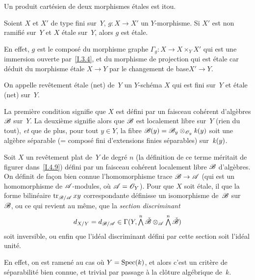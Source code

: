 \begin{corollaire}
\label{I.4.7}
Un produit cart\'esien de deux morphismes \'etales est itou.
\end{corollaire}

\begin{corollaire}
\label{I.4.8}
Soient $X$ et $X'$ de type fini sur~$Y$, $g\colon X\to X'$ un
$Y$-morphisme. Si $X'$ est non ramifi\'e sur~$Y$ et $X$ \'etale
sur~$Y$, alors $g$ est \'etale.
\end{corollaire}

En effet, $g$ est le compos\'e du morphisme graphe $\Gamma_g\colon
X\to X\times_Y X'$ qui est une immersion ouverte par~\ref{I.3.4}, et
du morphisme de projection qui est \'etale car d\'eduit du
morphisme \'etale $X\to Y$ par le \og changement de base\fg $X'\to Y$.

\begin{definition}
\label{I.4.9}
On appelle rev\^etement \'etale (\resp net)
de~$Y$ un $Y$-sch\'ema $X$ qui est fini sur~$Y$ et \'etale
(\resp net) sur~$Y$.
\end{definition}

\enlargethispage{.5cm}La premi\`ere condition signifie que $X$ est d\'efini par un
faisceau coh\'erent d'alg\`ebres $\cal{B}$ sur~$Y$. La
deuxi\`eme signifie alors que $\cal{B}$ est localement libre sur~$Y$
(\resp rien du tout), \emph{et} que de plus, pour tout $y\in Y$, la
fibre $\cal{B}(y)=\cal{B}_y\otimes_{\cal{O}_y}\kres(y)$ soit une
alg\`ebre s\'eparable (= compos\'e fini d'extensions finies
s\'eparables) sur~$\mathit{k}(y)$.

\begin{proposition}
\label{I.4.10}
Soit $X$ un rev\^etement plat de~$Y$ de degr\'e $n$ (la
d\'efinition de ce terme m\'eritait de figurer dans~\ref{I.4.9})
d\'efini par un faisceau coh\'erent localement libre $\cal{B}$
d'alg\`ebres. On d\'efinit de fa\c con bien connue
l'homomorphisme trace $\cal{B}\to\cal{A}$ (qui est un homomorphisme de
$\cal{A}$-modules, o\`u $\cal{A}=\cal{O}_Y$). Pour que $X$ soit
\'etale, il \fets que la forme bilin\'eaire
$\trace_{\cal{B}/\cal{A}}xy$ correspondante d\'efinisse un
isomorphisme de~$\cal{B}$ sur~$\cal{B}$, ou ce qui revient au
m\^eme, que la \emph{section discriminant}
$$
d_{X/Y} = d_{\cal{B}/\cal{A}} \in
\Gamma(Y,\tbigwedge^n\check{\cal{B}}\otimes_{\cal{A}}
\tbigwedge^n\check{\cal{B}})
$$
soit inversible, ou enfin que l'id\'eal discriminant d\'efini par
cette section soit l'id\'eal unit\'e.
\end{proposition}
En effet, on est ramen\'e au cas o\`u $Y=\operatorname{Spec}(k)$, et alors c'est
un crit\`ere de s\'eparabilit\'e bien connue, et trivial par
passage \`a la cl\^oture alg\'ebrique de~$k$.

